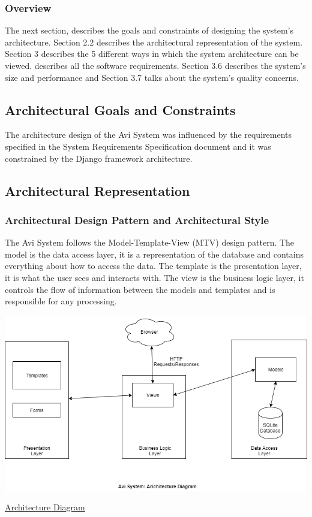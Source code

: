 \documentclass[10pt]{article}
\begin{document}
\subsubsection{Overview}

The next section, describes the goals and constraints of designing the system’s architecture. Section 2.2 describes the architectural representation of the system. Section 3 describes the 5 different ways in which the system architecture can be viewed.  describes all the software requirements. Section 3.6 describes the system’s size and performance and Section 3.7 talks about the system’s quality concerns.

\subsection{Architectural Goals and Constraints}

The architecture design of the Avi System was influenced by the requirements specified in the System Requirements Specification document and it was constrained by the Django framework architecture.

\subsection{Architectural Representation}


\subsubsection{Architectural Design Pattern and Architectural Style}

The Avi System follows the Model-Template-View (MTV) design pattern. The model is the data access layer, it is a representation of the database and contains everything about how to access the data.  The template is the presentation layer, it is what the user sees and interacts with. The view is the business logic layer, it controls the flow of information between the models and templates and is responsible for any processing.

\begin{center}
\includegraphics[width=.9\textwidth]{architecture_diagram.png}
\end{center}
\caption{\underline{Architecture Diagram}}
\end{document}
